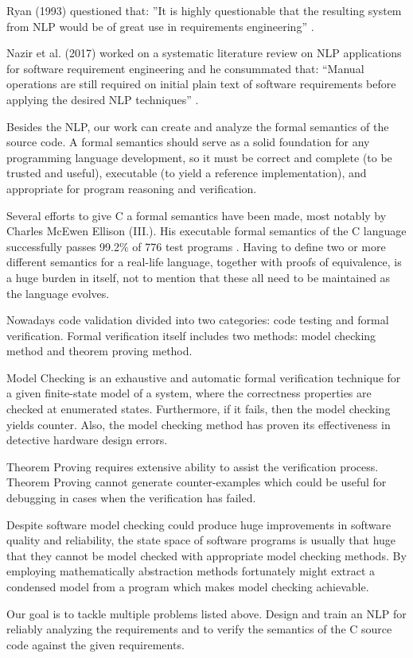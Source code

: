 \begin{multicols}{2}
	Ryan (1993) questioned that: ”It is highly questionable that the resulting system from \gls{NLP} would be of great use in requirements engineering” \cite{Ryan}.
	
	Nazir et al. (2017) worked on a systematic literature review on \gls{NLP} applications for software requirement engineering and he consummated that: “Manual operations are still required on initial plain text of software requirements before applying the desired \gls{NLP} techniques” \cite{Nazir}.
	
	Besides the \gls{NLP}, our work can create and analyze the formal semantics of the source code.  A formal semantics should serve as a solid foundation for any programming language development, so it must be correct and complete (to be trusted and useful), executable (to yield a reference implementation), and appropriate for program reasoning and verification.
	
	Several efforts to give C a formal semantics have been made, most notably by Charles McEwen Ellison (III.). His executable formal semantics of the C language successfully passes  99.2\% of 776 test programs \cite{Ellison:2012:EFS:2103621.2103719}. Having to define two or more different semantics for a real-life language, together with proofs of equivalence, is a huge burden in itself, not to mention that these all need to be maintained as the language evolves.
	
	Nowadays code validation divided into two categories: code testing and formal verification. Formal verification itself includes two methods: model checking method and theorem proving method.
	
	Model Checking \cite{Clarke:2000:MC:332656} is an exhaustive and automatic formal verification technique for a given finite-state model of a system, where the correctness properties are checked at enumerated states. Furthermore, if it fails, then the model checking yields counter. Also, the model checking method has proven its effectiveness in detective hardware design errors.
	
	Theorem Proving requires extensive ability to assist the verification process. Theorem Proving cannot generate counter-examples which could be useful for debugging in cases when the verification has failed.
	
	Despite software model checking could produce huge improvements in software quality and reliability, the state space of software programs is usually that huge that they cannot be model checked with appropriate model checking methods. By employing mathematically abstraction methods fortunately might extract a condensed model from a program which makes model checking achievable.
	
	Our goal is to tackle multiple problems listed above. Design and train an \gls{NLP} for reliably analyzing the requirements and to verify the semantics of the C source code against the given requirements.
	
\end{multicols}

